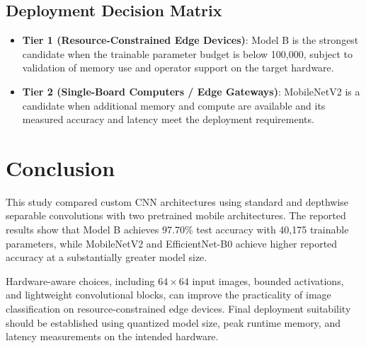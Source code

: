 \subsection{Deployment Decision Matrix}

\begin{itemize}
    \item \textbf{Tier 1 (Resource-Constrained Edge Devices)}: Model B is the strongest candidate when the trainable parameter budget is below 100,000, subject to validation of memory use and operator support on the target hardware.

    \item \textbf{Tier 2 (Single-Board Computers / Edge Gateways)}: MobileNetV2 is a candidate when additional memory and compute are available and its measured accuracy and latency meet the deployment requirements.
\end{itemize}

\section{Conclusion}

This study compared custom CNN architectures using standard and depthwise separable convolutions with two pretrained mobile architectures. The reported results show that Model B achieves 97.70\% test accuracy with 40,175 trainable parameters, while MobileNetV2 and EfficientNet-B0 achieve higher reported accuracy at a substantially greater model size.

Hardware-aware choices, including $64 \times 64$ input images, bounded activations, and lightweight convolutional blocks, can improve the practicality of image classification on resource-constrained edge devices. Final deployment suitability should be established using quantized model size, peak runtime memory, and latency measurements on the intended hardware.

\clearpage
{}
{}

